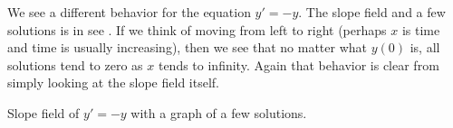 \documentclass{ximera}
\begin{document}
We see a different behavior for the equation $y' = -y$.  The slope field and a few solutions is in see . If we think of moving from left to right (perhaps $x$ is time and time is usually increasing), then we see that no matter what $y(0)$ is, all solutions tend to zero as $x$ tends to infinity. Again that behavior is clear from simply looking at the slope field itself.

\begin{myfig}
    \capstart
    \caption{Slope field of $y' = -y$ with a graph of a few solutions.\label{1.3:fig3}}
\end{myfig}
\end{document}
